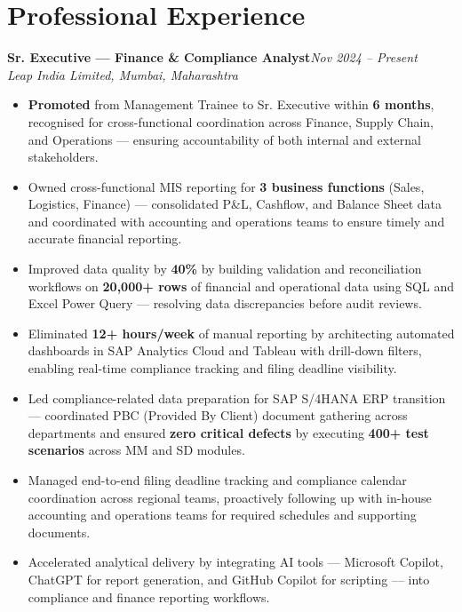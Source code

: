 \documentclass[10pt, letterpaper]{article}
\newcommand{\role}[3]{%
  \vspace{2pt}%
  {\bfseries #1}\hfill{\small\color{muted}\textit{#3}}\\[-2pt]%
  {\small\color{muted}\textit{#2}}%
}
\begin{document}
\section{Professional Experience}

\role{Sr. Executive — Finance \& Compliance Analyst}{Leap India Limited, Mumbai, Maharashtra}{Nov 2024 – Present}

\begin{itemize}
  \item \textbf{Promoted} from Management Trainee to Sr. Executive within \textbf{6 months}, recognised for cross-functional coordination across Finance, Supply Chain, and Operations — ensuring accountability of both internal and external stakeholders.
  \item Owned cross-functional MIS reporting for \textbf{3 business functions} (Sales, Logistics, Finance) — consolidated P\&L, Cashflow, and Balance Sheet data and coordinated with accounting and operations teams to ensure timely and accurate financial reporting.
  \item Improved data quality by \textbf{40\%} by building validation and reconciliation workflows on \textbf{20,000+ rows} of financial and operational data using SQL and Excel Power Query — resolving data discrepancies before audit reviews.
  \item Eliminated \textbf{12+ hours/week} of manual reporting by architecting automated dashboards in SAP Analytics Cloud and Tableau with drill-down filters, enabling real-time compliance tracking and filing deadline visibility.
  \item Led compliance-related data preparation for SAP S/4HANA ERP transition — coordinated PBC (Provided By Client) document gathering across departments and ensured \textbf{zero critical defects} by executing \textbf{400+ test scenarios} across MM and SD modules.
  \item Managed end-to-end filing deadline tracking and compliance calendar coordination across regional teams, proactively following up with in-house accounting and operations teams for required schedules and supporting documents.
  \item Accelerated analytical delivery by integrating AI tools — Microsoft Copilot, ChatGPT for report generation, and GitHub Copilot for scripting — into compliance and finance reporting workflows.
\end{itemize}

\vspace{1pt}
\end{document}
